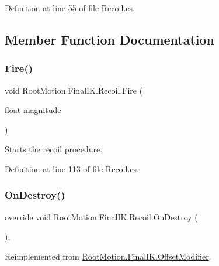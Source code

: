 Definition at line 55 of file Recoil.\+cs.



\subsection{Member Function Documentation}
\mbox{\label{class_root_motion_1_1_final_i_k_1_1_recoil_a7934b70f9f3ed0fe8a8bb83b35358bb2}} 
\subsubsection{\texorpdfstring{Fire()}{Fire()}}
{\footnotesize\ttfamily void Root\+Motion.\+Final\+I\+K.\+Recoil.\+Fire (\begin{DoxyParamCaption}\item[{float}]{magnitude }\end{DoxyParamCaption})}



Starts the recoil procedure. 



Definition at line 113 of file Recoil.\+cs.

\mbox{\label{class_root_motion_1_1_final_i_k_1_1_recoil_a3835ead88696a858c864e7884b269478}} 
\subsubsection{\texorpdfstring{On\+Destroy()}{OnDestroy()}}
{\footnotesize\ttfamily override void Root\+Motion.\+Final\+I\+K.\+Recoil.\+On\+Destroy (\begin{DoxyParamCaption}{ }\end{DoxyParamCaption})\hspace{0.3cm}{\ttfamily [protected]}, {\ttfamily [virtual]}}



Reimplemented from \mbox{\hyperlink{class_root_motion_1_1_final_i_k_1_1_offset_modifier_ac407dea9830e075f9ea4511ba4811d69}{Root\+Motion.\+Final\+I\+K.\+Offset\+Modifier}}.



